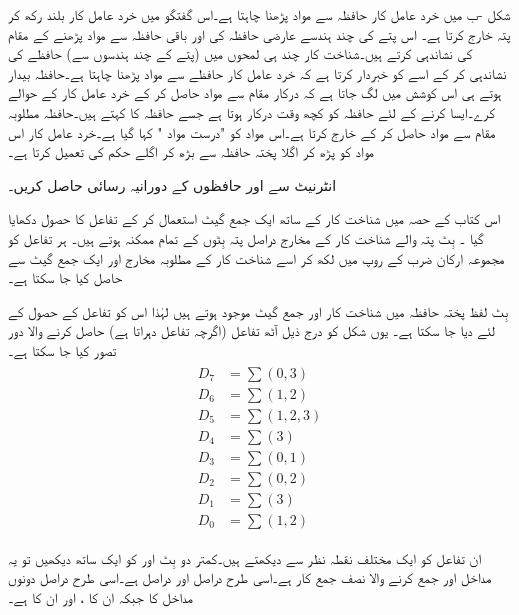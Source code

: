 شکل -ب  میں خرد عامل کار حافظہ سے مواد پڑھنا چاہتا ہے۔اس گفتگو میں خرد عامل کار       بلند رکھ کر پتہ خارج کرتا ہے۔ اس پتے کی چند ہندسے عارضی حافظہ کی   اور باقی حافظہ سے مواد پڑھنے کے مقام کی نشاندہی کرتے ہیں۔شناخت کار چند ہی لمحوں میں   (پتے کے  چند  ہندسوں سے) حافظے کی نشاندہی کر کے اسے کو خبردار کرتا ہے کہ خرد عامل کار حافظے  سے مواد پڑھنا چاہتا ہے۔حافظہ بیدار ہوتے ہی اس کوشش میں لگ جاتا ہے کہ درکار مقام سے مواد حاصل کر کے خرد عامل کار کے حوالے کرے۔ایسا کرنے کے لئے حافظہ کو کچھ وقت درکار ہوتا ہے جسے  حافظہ کا  کہتے ہیں۔حافظہ مطلوبہ مقام سے مواد حاصل کر کے خارج کرتا ہے۔اس مواد کو "درست مواد "  کہا گیا ہے۔خرد عامل کار اس مواد کو پڑھ کر  اگلا  پختہ حافظہ سے بڑھ کر اگلے حکم کی تعمیل کرتا ہے۔

انٹرنیٹ سے  اور  حافظوں کے دورانیہ رسائی حاصل کریں۔

اس کتاب کے حصہ   میں شناخت کار  کے ساتھ  ایک جمع گیٹ  استعمال کر کے  تفاعل کا حصول  دکھایا گیا ۔  بِٹ پتہ   والے  شناخت کار کے   مخارج دراصل پتہ   بِٹوں کے تمام ممکنہ   ہوتے ہیں۔  ہر تفاعل کو مجموعہ ارکان ضرب کے روپ  میں لکھ کر اسے شناخت کار کے مطلوبہ مخارج اور ایک  جمع گیٹ سے حاصل کیا جا سکتا ہے۔ 

 بِٹ  لفظ    پختہ حافظہ میں  شناخت کار اور   جمع گیٹ موجود ہوتے ہیں لہٰذا اس  کو   تفاعل کے حصول کے لئے  دیا جا سکتا ہے۔ یوں  شکل   کو درج ذیل  آٹھ تفاعل (اگرچہ    تفاعل  دہراتا ہے)  حاصل کرنے والا دور  تصور کیا جا سکتا ہے۔
\begin{gather}
\begin{aligned}
D_7&=\sum (0,3)\\
D_6&=\sum(1,2)\\
D_5&=\sum (1,2,3)\\
D_4&=\sum(3)\\
D_3&=\sum(0,1)\\
D_2&=\sum (0,2)\\
D_1&=\sum(3)\\
D_0&=\sum(1,2)
\end{aligned}
\end{gather}

ان  تفاعل کو ایک   مختلف  نقطہ نظر سے دیکھتے ہیں۔کمتر دو بِٹ   اور   کو  ایک ساتھ   دیکھیں تو یہ مداخل    اور  جمع کرنے والا نصف  جمع کار ہے۔اسی طرح  دراصل   اور  دراصل   ہے۔اسی طرح   دراصل دونوں مداخل کا    جبکہ   ان کا ،   اور  ان کا ہے۔
